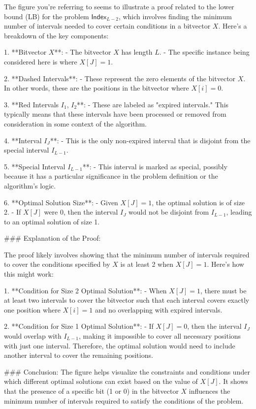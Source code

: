 The figure you're referring to seems to illustrate a proof related to the lower bound (LB) for the problem $\textsf{Index}_{L-2}$, which involves finding the minimum number of intervals needed to cover certain conditions in a bitvector \( X \). Here's a breakdown of the key components:

1. **Bitvector \( X \)**:
   - The bitvector \( X \) has length \( L \).
   - The specific instance being considered here is where \( X[J] = 1 \).

2. **Dashed Intervals**:
   - These represent the zero elements of the bitvector \( X \). In other words, these are the positions in the bitvector where \( X[i] = 0 \).

3. **Red Intervals \( I_1 \), \( I_2 \)**:
   - These are labeled as "expired intervals." This typically means that these intervals have been processed or removed from consideration in some context of the algorithm.

4. **Interval \( I_J \)**:
   - This is the only non-expired interval that is disjoint from the special interval \( I_{L-1} \).

5. **Special Interval \( I_{L-1} \)**:
   - This interval is marked as special, possibly because it has a particular significance in the problem definition or the algorithm's logic.

6. **Optimal Solution Size**:
   - Given \( X[J] = 1 \), the optimal solution is of size 2.
   - If \( X[J] \) were 0, then the interval \( I_J \) would not be disjoint from \( I_{L-1} \), leading to an optimal solution of size 1.

### Explanation of the Proof:

The proof likely involves showing that the minimum number of intervals required to cover the conditions specified by \( X \) is at least 2 when \( X[J] = 1 \). Here’s how this might work:

1. **Condition for Size 2 Optimal Solution**:
   - When \( X[J] = 1 \), there must be at least two intervals to cover the bitvector such that each interval covers exactly one position where \( X[i] = 1 \) and no overlapping with expired intervals.
   
2. **Condition for Size 1 Optimal Solution**:
   - If \( X[J] = 0 \), then the interval \( I_J \) would overlap with \( I_{L-1} \), making it impossible to cover all necessary positions with just one interval. Therefore, the optimal solution would need to include another interval to cover the remaining positions.

### Conclusion:
The figure helps visualize the constraints and conditions under which different optimal solutions can exist based on the value of \( X[J] \). It shows that the presence of a specific bit (1 or 0) in the bitvector \( X \) influences the minimum number of intervals required to satisfy the conditions of the problem.